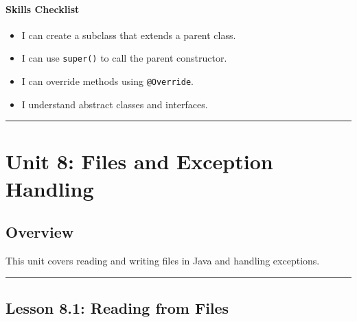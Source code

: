 \documentclass[
  justified,
  openright,
]{tufte-book}
\let\subsubsection\paragraph
\let\paragraph\paragraph
\let\subsubsection\paragraph
\let\paragraph\paragraph
\providecommand{\tightlist}{%
  \setlength{\itemsep}{0pt}\setlength{\parskip}{0pt}}
\begin{document}
\subsubsection{Skills Checklist}\label{skills-checklist-16}

\begin{itemize}
\tightlist
\item[$\square$]
  I can create a subclass that extends a parent class.
\item[$\square$]
  I can use \texttt{super()} to call the parent constructor.
\item[$\square$]
  I can override methods using \texttt{@Override}.
\item[$\square$]
  I understand abstract classes and interfaces.
\end{itemize}

\begin{center}\rule{0.5\linewidth}{0.5pt}\end{center}

\section{Unit 8: Files and Exception
Handling}\label{unit-8-files-and-exception-handling-1}

\subsection{Overview}\label{overview-8}

This unit covers reading and writing files in Java and handling
exceptions.

\begin{center}\rule{0.5\linewidth}{0.5pt}\end{center}

\subsection{Lesson 8.1: Reading from
Files}\label{lesson-8.1-reading-from-files}
\end{document}
